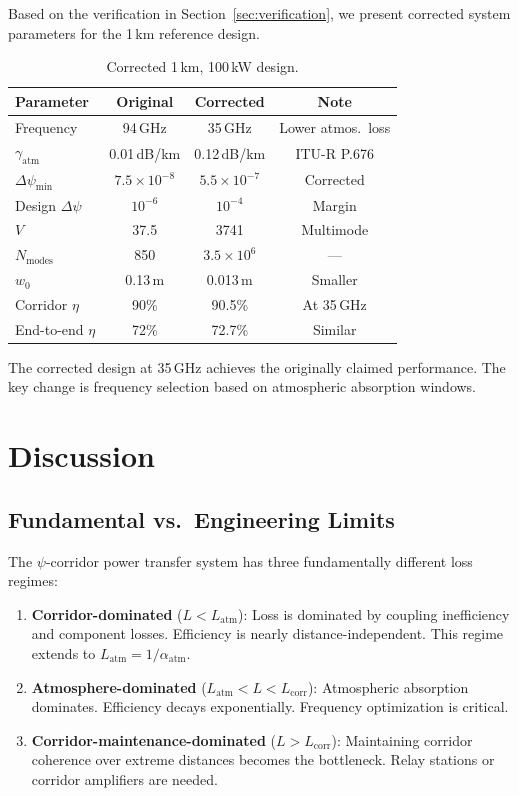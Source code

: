 \documentclass[journal,twocolumn]{IEEEtran}
\begin{document}
Based on the verification in Section~\ref{sec:verification}, we present
corrected system parameters for the 1\,km reference design.

\begin{table}[h]
\caption{Corrected 1\,km, 100\,kW design.}
\label{tab:corrected}
\centering
\begin{tabular}{lccc}
\toprule
Parameter & Original & Corrected & Note \\
\midrule
Frequency & 94\,GHz & 35\,GHz & Lower atmos.\ loss \\
$\gamma_\text{atm}$ & 0.01\,dB/km & 0.12\,dB/km & ITU-R P.676 \\
$\Delta\psi_\text{min}$ & $7.5\times10^{-8}$ & $5.5\times10^{-7}$ & Corrected \\
Design $\Delta\psi$ & $10^{-6}$ & $10^{-4}$ & Margin \\
$V$ & 37.5 & 3741 & Multimode \\
$N_\text{modes}$ & 850 & $3.5\times10^6$ & --- \\
$w_0$ & 0.13\,m & 0.013\,m & Smaller \\
Corridor $\eta$ & 90\% & 90.5\% & At 35\,GHz \\
End-to-end $\eta$ & 72\% & 72.7\% & Similar \\
\bottomrule
\end{tabular}
\end{table}

The corrected design at 35\,GHz achieves the originally claimed
performance. The key change is frequency selection based on
atmospheric absorption windows.

\section{Discussion}\label{sec:discussion}

\subsection{Fundamental vs.\ Engineering Limits}

The $\psi$-corridor power transfer system has three fundamentally
different loss regimes:

\begin{enumerate}
\item \textbf{Corridor-dominated} ($L < L_\text{atm}$): Loss is
dominated by coupling inefficiency and component losses. Efficiency
is nearly distance-independent. This regime extends to
$L_\text{atm} = 1/\alpha_\text{atm}$.

\item \textbf{Atmosphere-dominated} ($L_\text{atm} < L < L_\text{corr}$):
Atmospheric absorption dominates. Efficiency decays exponentially.
Frequency optimization is critical.

\item \textbf{Corridor-maintenance-dominated} ($L > L_\text{corr}$):
Maintaining corridor coherence over extreme distances becomes the
bottleneck. Relay stations or corridor amplifiers are needed.
\end{enumerate}
\end{document}
